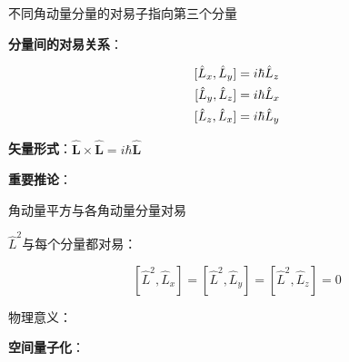 \begin{frame}{不同角动量分量的对易子指向第三个分量}
  
    \begin{iqbitemize}
    \item \textbf{分量间的对易关系}：
    \end{iqbitemize}
      \[
        \begin{aligned}
          \relax[\hat{L}_x, \hat{L}_y] &= i\hbar\hat{L}_z \\
          [\hat{L}_y, \hat{L}_z] &= i\hbar\hat{L}_x \\
          [\hat{L}_z, \hat{L}_x] &= i\hbar\hat{L}_y
        \end{aligned}
      \]
    \begin{iqbitemize}
    \item \textbf{矢量形式}：$\hat{\mathbf{L}} \times \hat{\mathbf{L}} = i\hbar\hat{\mathbf{L}}$
    \item \textbf{重要推论}：
    \end{iqbitemize}
    \iqbsmallsep

    \end{frame}

\begin{frame}{角动量平方与各角动量分量对易}
  
    \begin{iqbitemize}
    \item $\hat{L}^2$与每个分量都对易：
    \end{iqbitemize}
      \[
        [\hat{L}^2, \hat{L}_x] = [\hat{L}^2, \hat{L}_y] = [\hat{L}^2, \hat{L}_z] = 0
      \]
    \begin{iqbitemize}
    \item 物理意义：
    \item \textbf{空间量子化}：
    \end{iqbitemize}
    \iqbtinysep

  

\end{frame}

